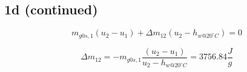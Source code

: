 

\subsection*{1d (continued)}

\begin{equation*}
m_{g0s,1} (u_2 - u_1) + \Delta m_{12} (u_2 - h_{w@20^\circ C}) = 0
\end{equation*}

\begin{equation*}
\Delta m_{12} = -m_{g0s,1} \frac{(u_2 - u_1)}{u_2 - h_{w@20^\circ C}} = 3756.84 \frac{J}{g}
\end{equation*}